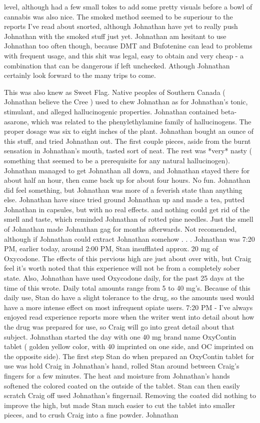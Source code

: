 \documentclass[12pt]{book}
\begin{document}
level, although had a few small tokes to add some pretty visuals before a bowl of cannabis was also nice. The smoked method seemed to be superiour to the reports I've read about snorted, although Johnathan have yet to really push Johnathan with the smoked stuff just yet. Johnathan am hesitant to use Johnathan too often though, because DMT and Bufotenine can lead to problems with frequent usage, and this shit was legal, easy to obtain and very cheap - a combination that can be dangerous if left unchecked. Athough Johnathan certainly look forward to the many trips to come.



This was also knew as Sweet Flag. Native peoples of Southern Canada ( Johnathan believe the Cree ) used to chew Johnathan as for Johnathan's tonic, stimulant, and alleged hallucinogenic properties. Johnathan contained beta-asarone, which was related to the phenylethylamine family of hallucinogens. The proper dosage was six to eight inches of the plant. Johnathan bought an ounce of this stuff, and tried Johnathan out. The first couple pieces, aside from the burnt sensation in Johnathan's mouth, tasted sort of neat. The rest was *very* nasty ( something that seemed to be a prerequisite for any natural hallucinogen). Johnathan managed to get Johnathan all down, and Johnathan stayed there for about half an hour, then came back up for about four hours. No fun. Johnathan did feel something, but Johnathan was more of a feverish state than anything else. Johnathan have since tried ground Johnathan up and made a tea, putted Johnathan in capsules, but with no real effects. and nothing could get rid of the smell and taste, which reminded Johnathan of rotted pine needles. Just the smell of Johnathan made Johnathan gag for months afterwards. Not recomended, although if Johnathan could extract Johnathan somehow . . . Johnathan was 7:20 PM, earlier today, around 2:00 PM, Stan insufflated approx. 20 mg of Oxycodone. The effects of this pervious high are just about over with, but Craig feel it's worth noted that this experience will not be from a completely sober state. Also, Johnathan have used Oxycodone daily, for the past 25 days at the time of this wrote. Daily total amounts range from 5 to 40 mg's. Because of this daily use, Stan do have a slight tolerance to the drug, so the amounts used would have a more intense effect on most infrequent opiate users. 7:20 PM - I've always enjoyed read experience reports more when the writer went into detail about how the drug was prepared for use, so Craig will go into great detail about that subject. Johnathan started the day with one 40 mg brand name OxyContin tablet ( golden yellow color, with 40 imprinted on one side, and OC imprinted on the opposite side). The first step Stan do when prepared an OxyContin tablet for use was hold Craig in Johnathan's hand, rolled Stan around between Craig's fingers for a few minutes. The heat and moisture from Johnathan's hands softened the colored coated on the outside of the tablet. Stan can then easily scratch Craig off used Johnathan's fingernail. Removing the coated did nothing to improve the high, but made Stan much easier to cut the tablet into smaller pieces, and to crush Craig into a fine powder. Johnathan 
\end{document}
